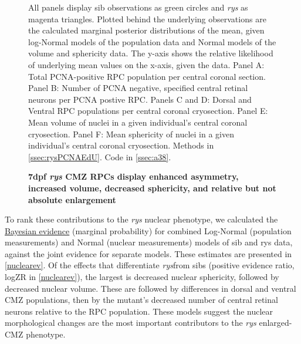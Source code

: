 \begin{figure}[!h]
    \caption{{\bf 7dpf \textit{rys} CMZ RPCs display enhanced asymmetry, increased volume, decreased sphericity, and relative but not absolute enlargement}}
    \label{nuclearstudy}
    All panels display sib observations as green circles and \textit{rys} as magenta triangles. Plotted behind the underlying observations are the calculated marginal posterior distributions of the mean, given log-Normal models of the population data and Normal models of the volume and sphericity data. The y-axis shows the relative likelihood of underlying mean values on the x-axis, given the data.
    Panel A: Total PCNA-positive RPC population per central coronal section.
    Panel B: Number of PCNA negative, specified central retinal neurons per PCNA postive RPC.
    Panels C and D: Dorsal and Ventral RPC populations per central coronal cryosection.
    Panel E: Mean volume of nuclei in a given individual's central coronal cryosection.
    Panel F: Mean sphericity of nuclei in a given individual's central coronal cryosection.
    Methods in \autoref{ssec:rysPCNAEdU}.
    Code in \autoref{ssec:a38}.
\end{figure}

To rank these contributions to the \textit{rys} nuclear phenotype, we calculated the \hyperref[ssec:BayesEpistemology]{Bayesian evidence} (marginal probability) for combined Log-Normal (population measurements) and Normal (nuclear measurements) models of sib and rys data, against the joint evidence for separate models. These estimates are presented in \autoref{nuclearev}. Of the effects that differentiate \textit{rys}from sibs (positive evidence ratio, logZR in \autoref{nuclearev}), the largest is decreased nuclear sphericity, followed by decreased nuclear volume. These are followed by differences in dorsal and ventral CMZ populations, then by the mutant's decreased number of central retinal neurons relative to the RPC population. These models suggest the nuclear morphological changes are the most important contributors to the \textit{rys} enlarged-CMZ phenotype.

